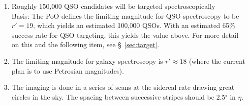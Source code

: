 \begin{enumerate}
\item Roughly 150,000 QSO candidates will be targeted spectroscopically \\
Basis: The PoO defines the limiting magnitude for QSO spectroscopy to be
$r' = 19$, which yields an estimated 100,000 QSOs.  With an estimated
65\% success rate for QSO targeting, this yields the value above.  For
more detail on this and the following item, see \S~\ref{sec:target}.

\item The limiting magnitude for galaxy spectroscopy is $r' \approx
18$ (where the current plan is to use Petrosian magnitudes).

\item The imaging is done in a series of scans at the sidereal rate
drawing great circles 
in the sky.  The spacing between successive stripes should be
2.5$^\circ$ in $\eta$.
\end{enumerate}

